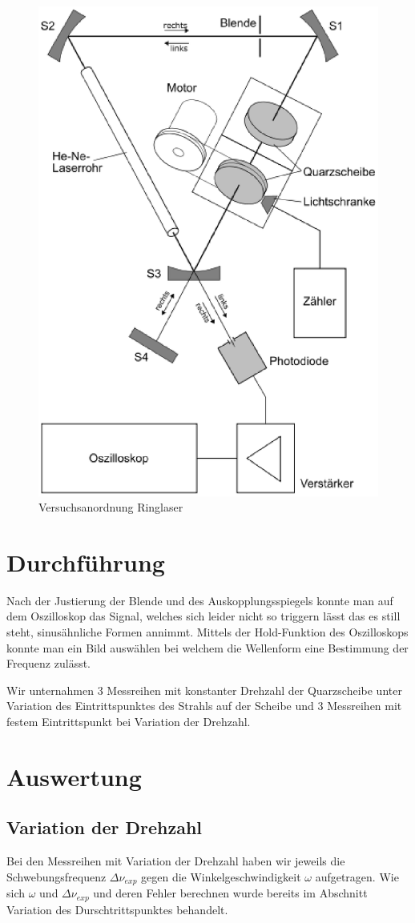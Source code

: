 \documentclass[12pt]{article}
\begin{document}
\begin{figure}[H]  
\centering
\includegraphics[width=0.7\linewidth]{pictures/abb4.eps}
\caption{Versuchsanordnung Ringlaser}
\label{versuchsaufbau}
\end{figure}

\section{Durchführung}
Nach der Justierung der Blende und des Auskopplungsspiegels konnte man auf dem Oszilloskop das Signal, welches sich leider nicht so triggern lässt das es 
still steht, sinusähnliche Formen annimmt. Mittels der Hold-Funktion des Oszilloskops konnte man ein Bild auswählen bei welchem die Wellenform eine
Bestimmung der Frequenz zulässt. 

Wir unternahmen 3 Messreihen mit konstanter Drehzahl der Quarzscheibe unter Variation des Eintrittspunktes des Strahls auf der Scheibe und 3 Messreihen
mit festem Eintrittspunkt bei Variation der Drehzahl.
\section{Auswertung}


\subsection{Variation der Drehzahl}
Bei den Messreihen mit Variation der Drehzahl haben wir jeweils die Schwebungsfrequenz $\Delta\nu_{exp}$ gegen die Winkelgeschwindigkeit $\omega$
aufgetragen. Wie sich $\omega$ und $\Delta\nu_{exp}$ und deren Fehler berechnen wurde bereits im Abschnitt Variation des Durschtrittspunktes behandelt.
\end{document}
